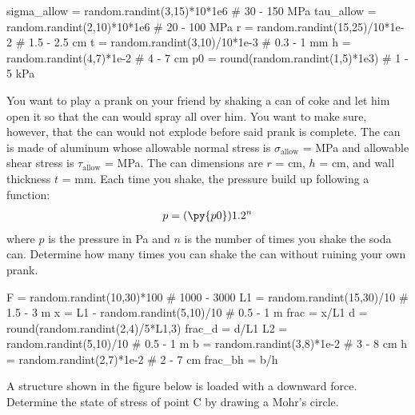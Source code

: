 \documentclass[
fontsize=10pt,
a4paper,
twosides=false,
open=any,
svgnames,
]{kaobook} %
\begin{document}
\begin{exercises}
\begin{pycode}
sigma_allow = random.randint(3,15)*10*1e6 # 30 - 150 MPa
tau_allow = random.randint(2,10)*10*1e6 # 20 - 100 MPa
r = random.randint(15,25)/10*1e-2 # 1.5 - 2.5 cm
t = random.randint(3,10)/10*1e-3 # 0.3 - 1 mm
h = random.randint(4,7)*1e-2 # 4 - 7 cm
p0 = round(random.randint(1,5)*1e3) # 1 - 5 kPa
\end{pycode}

  \item You want to play a prank on your friend by shaking a can of coke and let him open it so that the can would spray all over him. You want to make sure, however, that the can would not explode before said prank is complete. The can is made of aluminum whose allowable normal stress is $\sigma_{\text{allow}}$ =  MPa and allowable shear stress is $\tau_{\text{allow}}$ =  MPa. The can dimensions are $r$ =  cm, $h$ =  cm, and wall thickness $t$ =  mm. Each time you shake, the pressure build up following a function:
  \begin{align*}
    p = (\py{p0})1.2^{n}
  \end{align*}
  where $p$ is the pressure in Pa and $n$ is the number of times you shake the soda can. Determine how many times you can shake the can without ruining your own prank.

\begin{pycode}
F = random.randint(10,30)*100 # 1000 - 3000
L1 = random.randint(15,30)/10 # 1.5 - 3 m
x = L1 - random.randint(5,10)/10 # 0.5 - 1 m
frac = x/L1
d = round(random.randint(2,4)/5*L1,3)
frac_d = d/L1
L2 = random.randint(5,10)/10 # 0.5 - 1 m
b = random.randint(3,8)*1e-2 # 3 - 8 cm
h = random.randint(2,7)*1e-2 # 2 - 7 cm
frac_bh = b/h
\end{pycode}

  \item A structure shown in the figure below is loaded with a downward force. Determine the state of stress of point C by drawing a Mohr's circle.


\end{exercises}
\end{document}
